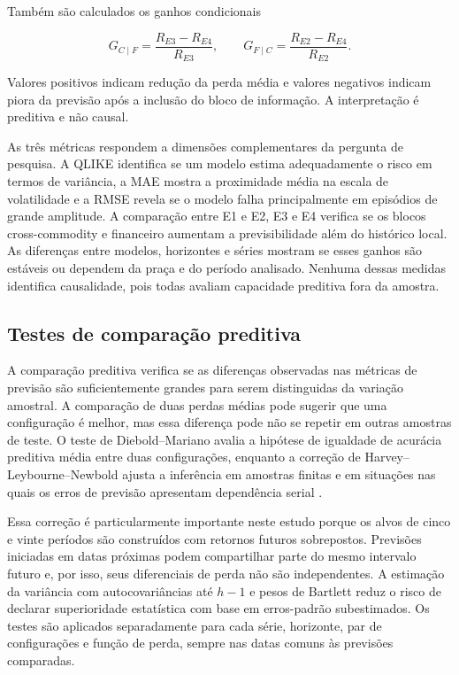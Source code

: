 \documentclass[a4paper,fleqn]{cas-sc}
\begin{document}
Também são calculados os ganhos condicionais

\begin{equation}
G_{C\mid F}=\frac{R_{E3}-R_{E4}}{R_{E3}},
\qquad
G_{F\mid C}=\frac{R_{E2}-R_{E4}}{R_{E2}}.
\label{eq:conditional_gain}
\end{equation}

Valores positivos indicam redução da perda média e valores negativos indicam piora da previsão após a inclusão do bloco de informação. A interpretação é preditiva e não causal.

As três métricas respondem a dimensões complementares da pergunta de pesquisa. A QLIKE identifica se um modelo estima adequadamente o risco em termos de variância, a MAE mostra a proximidade média na escala de volatilidade e a RMSE revela se o modelo falha principalmente em episódios de grande amplitude. A comparação entre E1 e E2, E3 e E4 verifica se os blocos cross-commodity e financeiro aumentam a previsibilidade além do histórico local. As diferenças entre modelos, horizontes e séries mostram se esses ganhos são estáveis ou dependem da praça e do período analisado. Nenhuma dessas medidas identifica causalidade, pois todas avaliam capacidade preditiva fora da amostra.

\subsection{Testes de comparação preditiva}
\label{subsec:dm_test}

A comparação preditiva verifica se as diferenças observadas nas métricas de previsão são suficientemente grandes para serem distinguidas da variação amostral. A comparação de duas perdas médias pode sugerir que uma configuração é melhor, mas essa diferença pode não se repetir em outras amostras de teste. O teste de Diebold--Mariano avalia a hipótese de igualdade de acurácia preditiva média entre duas configurações, enquanto a correção de Harvey--Leybourne--Newbold ajusta a inferência em amostras finitas e em situações nas quais os erros de previsão apresentam dependência serial \citep{DieboldMariano1995,HarveyLeybourneNewbold1997}.

Essa correção é particularmente importante neste estudo porque os alvos de cinco e vinte períodos são construídos com retornos futuros sobrepostos. Previsões iniciadas em datas próximas podem compartilhar parte do mesmo intervalo futuro e, por isso, seus diferenciais de perda não são independentes. A estimação da variância com autocovariâncias até \(h-1\) e pesos de Bartlett reduz o risco de declarar superioridade estatística com base em erros-padrão subestimados. Os testes são aplicados separadamente para cada série, horizonte, par de configurações e função de perda, sempre nas datas comuns às previsões comparadas.
\end{document}
